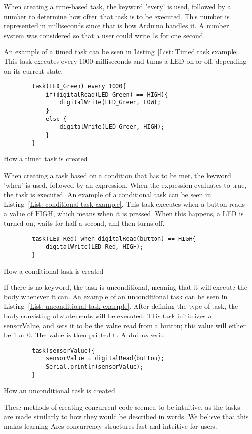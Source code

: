 When creating a time-based task, the keyword 'every' is used, followed by a number to determine how often that task is to be executed. This number is represented in milliseconds since that is how Arduino handles it. A number system was considered so that a user could write 1s for one second.

An example of a timed task can be seen in Listing~\ref{List: Timed task example}. This task executes every 1000 milliseconds and turns a LED on or off, depending on its current state.


\begin{listing}[htb!]
    \begin{verbatim}
        task(LED_Green) every 1000{
            if(digitalRead(LED_Green) == HIGH){
                digitalWrite(LED_Green, LOW);
            }
            else {
                digitalWrite(LED_Green, HIGH);
            }
        }
    \end{verbatim}
    \caption{How a timed task is created}
    \label{List: Timed task example}
\end{listing}


When creating a task based on a condition that has to be met, the keyword 'when' is used, followed by an expression. When the expression evaluates to true, the task is executed. An example of a conditional task can be seen in Listing~\ref{List: conditional task example}. This task executes when a button reads a value of HIGH, which means when it is pressed. When this happens, a LED is turned on, waits for half a second, and then turns off.


\begin{listing}[htb!]
    \begin{verbatim}
        task(LED_Red) when digitalRead(button) == HIGH{
            digitalWrite(LED_Red, HIGH);
        }
    \end{verbatim}
    \caption{How a conditional task is created}
    \label{List: conditional task example}
\end{listing}


If there is no keyword, the task is unconditional, meaning that it will execute the body whenever it can. An example of an unconditional task can be seen in Listing~\ref{List: unconditional task example}. After defining the type of task, the body consisting of statements will be executed. This task initializes a sensorValue, and sets it to be the value read from a button; this value will either be 1 or 0. The value is then printed to Arduinos serial.


\begin{listing}[htb!]
    \begin{verbatim}
        task(sensorValue){
            sensorValue = digitalRead(button);
            Serial.println(sensorValue);
        }
    \end{verbatim}
    \caption{How an unconditional task is created}
    \label{List: unconditional task example}
\end{listing}


These methods of creating concurrent code seemed to be intuitive, as the tasks are made similarly to how they would be described in words. We believe that this makes learning Arcs concurrency structures fast and intuitive for users.
